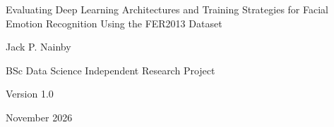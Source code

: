 \documentclass[12pt, a4paper]{report}
\begin{document}
	\begin{titlepage}
		\hypertarget{titlepage}{}
		\centering
		{\Huge\mdseries Evaluating Deep Learning Architectures and Training Strategies for Facial Emotion Recognition Using the FER2013 Dataset\par}
		\vspace{2cm}
		{\Large Jack P. Nainby\par}
		\vfill
		{\large BSc Data Science Independent Research Project\par}
		\vspace{0.3cm}
		{\large Version 1.0 \par}
		\vspace{0.3cm}
		{\large November 2026\par}
	\end{titlepage}
	
	
\end{document}
